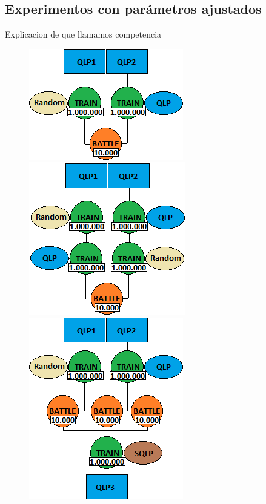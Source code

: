 \documentclass[10pt, a4paper]{article}
\begin{document}
\subsection{Experimentos con parámetros ajustados}

Explicacion de que llamamos competencia

\begin{figure}[H]
  \begin{minipage}[c]{1\textwidth}
  \includegraphics[scale=0.4]{E1.png}
  \includegraphics[scale=0.4]{E2.png}
  \includegraphics[scale=0.4]{E3.png}
  \end{minipage}
\end{figure}
\end{document}
